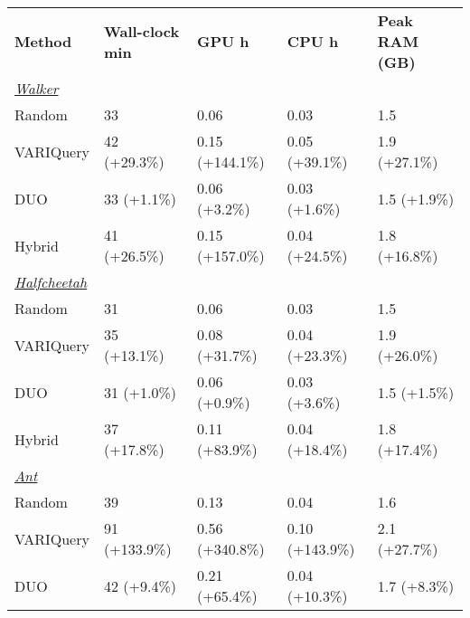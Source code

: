 \begin{table}[h]
  \centering
  \begin{tabular}{lllll}
    \textbf{Method} & \textbf{Wall-clock min} & \textbf{GPU h} & \textbf{CPU h} & \textbf{Peak RAM (GB)} \\
    
    \emph{\underline{Walker}} & & & & \\
    \hspace*{2mm}Random     & 33                   & 0.06         & 0.03         & 1.5                \\
    \hspace*{2mm}VARIQuery  & 42 (+29.3\%)         & 0.15 (+144.1\%) & 0.05 (+39.1\%) & 1.9 (+27.1\%)      \\
    \hspace*{2mm}DUO        & 33 (+1.1\%)          & 0.06 (+3.2\%) & 0.03 (+1.6\%) & 1.5 (+1.9\%)       \\
    \hspace*{2mm}Hybrid     & 41 (+26.5\%)         & 0.15 (+157.0\%) & 0.04 (+24.5\%) & 1.8 (+16.8\%)      \\\n    
    \emph{\underline{Halfcheetah}} & & & & \\
    \hspace*{2mm}Random     & 31                   & 0.06         & 0.03         & 1.5                \\
    \hspace*{2mm}VARIQuery  & 35 (+13.1\%)         & 0.08 (+31.7\%) & 0.04 (+23.3\%) & 1.9 (+26.0\%)      \\
    \hspace*{2mm}DUO        & 31 (+1.0\%)          & 0.06 (+0.9\%) & 0.03 (+3.6\%) & 1.5 (+1.5\%)       \\
    \hspace*{2mm}Hybrid     & 37 (+17.8\%)         & 0.11 (+83.9\%) & 0.04 (+18.4\%) & 1.8 (+17.4\%)      \\\n    
    \emph{\underline{Ant}} & & & & \\
    \hspace*{2mm}Random     & 39                   & 0.13         & 0.04         & 1.6                \\
    \hspace*{2mm}VARIQuery  & 91 (+133.9\%)        & 0.56 (+340.8\%) & 0.10 (+143.9\%) & 2.1 (+27.7\%)      \\
    \hspace*{2mm}DUO        & 42 (+9.4\%)          & 0.21 (+65.4\%) & 0.04 (+10.3\%) & 1.7 (+8.3\%)       \\

\end{tabular}
\end{table}
